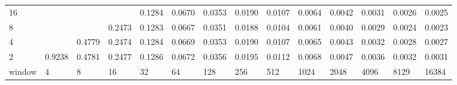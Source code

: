 \begin{table}[h]
{\begin{tabular}{lrrrrrrrrrrrrr}
			\multicolumn{1}{|l|}{16} &  &  &  & \cellcolor[HTML]{99E600}0.1284 & \cellcolor[HTML]{99E600}0.0670 & \cellcolor[HTML]{99E600}0.0353 & \cellcolor[HTML]{99E600}0.0190 & \cellcolor[HTML]{99E600}0.0107 & \cellcolor[HTML]{99E600}0.0064 & \cellcolor[HTML]{99E600}0.0042 & \cellcolor[HTML]{99E600}0.0031 & \cellcolor[HTML]{99E600}0.0026 & \cellcolor[HTML]{99E600}0.0025 \\ \cline{1-1}
			\multicolumn{1}{|l|}{8} &  &  & \cellcolor[HTML]{E69900}0.2473 & \cellcolor[HTML]{99E600}0.1283 & \cellcolor[HTML]{99E600}0.0667 & \cellcolor[HTML]{99E600}0.0351 & \cellcolor[HTML]{99E600}0.0188 & \cellcolor[HTML]{99E600}0.0104 & \cellcolor[HTML]{99E600}0.0061 & \cellcolor[HTML]{99E600}0.0040 & \cellcolor[HTML]{99E600}0.0029 & \cellcolor[HTML]{99E600}0.0024 & \cellcolor[HTML]{99E600}0.0023 \\ \cline{1-1}
			\multicolumn{1}{|l|}{4} &  & \cellcolor[HTML]{E60000}0.4779 & \cellcolor[HTML]{E69900}0.2474 & \cellcolor[HTML]{99E600}0.1284 & \cellcolor[HTML]{99E600}0.0669 & \cellcolor[HTML]{99E600}0.0353 & \cellcolor[HTML]{99E600}0.0190 & \cellcolor[HTML]{99E600}0.0107 & \cellcolor[HTML]{99E600}0.0065 & \cellcolor[HTML]{99E600}0.0043 & \cellcolor[HTML]{99E600}0.0032 & \cellcolor[HTML]{99E600}0.0028 & \cellcolor[HTML]{99E600}0.0027 \\ \cline{1-1}
			\multicolumn{1}{|l|}{2} & \cellcolor[HTML]{4C00E6}0.9238 & \cellcolor[HTML]{E60000}0.4781 & \cellcolor[HTML]{E69900}0.2477 & \cellcolor[HTML]{99E600}0.1286 & \cellcolor[HTML]{99E600}0.0672 & \cellcolor[HTML]{99E600}0.0356 & \cellcolor[HTML]{99E600}0.0195 & \cellcolor[HTML]{99E600}0.0112 & \cellcolor[HTML]{99E600}0.0068 & \cellcolor[HTML]{99E600}0.0047 & \cellcolor[HTML]{99E600}0.0036 & \cellcolor[HTML]{99E600}0.0032 & \cellcolor[HTML]{99E600}0.0031 \\ \hline
			\multicolumn{1}{l|}{window} & \multicolumn{1}{l|}{4} & \multicolumn{1}{l|}{8} & \multicolumn{1}{l|}{16} & \multicolumn{1}{l|}{32} & \multicolumn{1}{l|}{64} & \multicolumn{1}{l|}{128} & \multicolumn{1}{l|}{256} & \multicolumn{1}{l|}{512} & \multicolumn{1}{l|}{1024} & \multicolumn{1}{l|}{2048} & \multicolumn{1}{l|}{4096} & \multicolumn{1}{l|}{8129} & \multicolumn{1}{l|}{16384} \\ \cline{2-14} 
		\end{tabular}
	}
\end{table}




